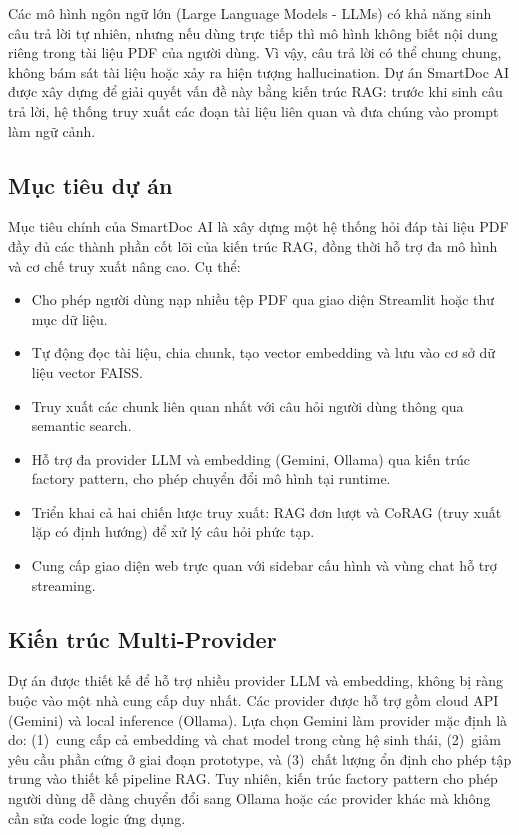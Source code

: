 \documentclass[10pt, conference, a4paper, compsocconf]{IEEEtran}
\begin{document}
Các mô hình ngôn ngữ lớn (Large Language Models - LLMs) có khả năng sinh câu trả lời tự nhiên, nhưng nếu dùng trực tiếp thì mô hình không biết nội dung riêng trong tài liệu PDF của người dùng. Vì vậy, câu trả lời có thể chung chung, không bám sát tài liệu hoặc xảy ra hiện tượng hallucination. Dự án SmartDoc AI được xây dựng để giải quyết vấn đề này bằng kiến trúc RAG: trước khi sinh câu trả lời, hệ thống truy xuất các đoạn tài liệu liên quan và đưa chúng vào prompt làm ngữ cảnh.

\subsection{Mục tiêu dự án}
Mục tiêu chính của SmartDoc AI là xây dựng một hệ thống hỏi đáp tài liệu PDF đầy đủ các thành phần cốt lõi của kiến trúc RAG, đồng thời hỗ trợ đa mô hình và cơ chế truy xuất nâng cao. Cụ thể:
\begin{itemize}
    \item Cho phép người dùng nạp nhiều tệp PDF qua giao diện Streamlit hoặc thư mục dữ liệu.
    \item Tự động đọc tài liệu, chia chunk, tạo vector embedding và lưu vào cơ sở dữ liệu vector FAISS.
    \item Truy xuất các chunk liên quan nhất với câu hỏi người dùng thông qua semantic search.
    \item Hỗ trợ đa provider LLM và embedding (Gemini, Ollama) qua kiến trúc factory pattern, cho phép chuyển đổi mô hình tại runtime.
    \item Triển khai cả hai chiến lược truy xuất: RAG đơn lượt và CoRAG (truy xuất lặp có định hướng) để xử lý câu hỏi phức tạp.
    \item Cung cấp giao diện web trực quan với sidebar cấu hình và vùng chat hỗ trợ streaming.
\end{itemize}

\subsection{Kiến trúc Multi-Provider}
Dự án được thiết kế để hỗ trợ nhiều provider LLM và embedding, không bị ràng buộc vào một nhà cung cấp duy nhất. Các provider được hỗ trợ gồm cloud API (Gemini) và local inference (Ollama). Lựa chọn Gemini làm provider mặc định là do: (1)~cung cấp cả embedding và chat model trong cùng hệ sinh thái, (2)~giảm yêu cầu phần cứng ở giai đoạn prototype, và (3)~chất lượng ổn định cho phép tập trung vào thiết kế pipeline RAG. Tuy nhiên, kiến trúc factory pattern cho phép người dùng dễ dàng chuyển đổi sang Ollama hoặc các provider khác mà không cần sửa code logic ứng dụng.
\end{document}
